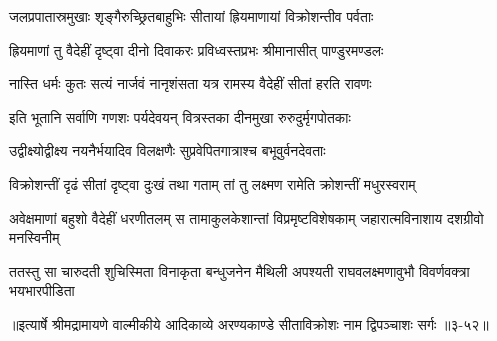 \twolineshloka
{जलप्रपातास्रमुखाः शृङ्गैरुच्छ्रितबाहुभिः}
{सीतायां ह्रियमाणायां विक्रोशन्तीव पर्वताः} %

\twolineshloka
{ह्रियमाणां तु वैदेहीं दृष्ट्वा दीनो दिवाकरः}
{प्रविध्वस्तप्रभः श्रीमानासीत् पाण्डुरमण्डलः} %

\twolineshloka
{नास्ति धर्मः कुतः सत्यं नार्जवं नानृशंसता}
{यत्र रामस्य वैदेहीं सीतां हरति रावणः} %

\twolineshloka
{इति भूतानि सर्वाणि गणशः पर्यदेवयन्}
{वित्रस्तका दीनमुखा रुरुदुर्मृगपोतकाः} %

\twolineshloka
{उद्वीक्ष्योद्वीक्ष्य नयनैर्भयादिव विलक्षणैः}
{सुप्रवेपितगात्राश्च बभूवुर्वनदेवताः} %

\twolineshloka
{विक्रोशन्तीं दृढं सीतां दृष्ट्वा दुःखं तथा गताम्}
{तां तु लक्ष्मण रामेति क्रोशन्तीं मधुरस्वराम्} %

\threelineshloka
{अवेक्षमाणां बहुशो वैदेहीं धरणीतलम्}
{स तामाकुलकेशान्तां विप्रमृष्टविशेषकाम्}
{जहारात्मविनाशाय दशग्रीवो मनस्विनीम्} %

\twolineshloka
{ततस्तु सा चारुदती शुचिस्मिता विनाकृता बन्धुजनेन मैथिली}
{अपश्यती राघवलक्ष्मणावुभौ विवर्णवक्त्रा भयभारपीडिता} %


॥इत्यार्षे श्रीमद्रामायणे वाल्मीकीये आदिकाव्ये अरण्यकाण्डे सीताविक्रोशः नाम द्विपञ्चाशः सर्गः ॥३-५२॥
